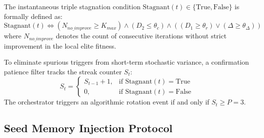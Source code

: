 The instantaneous triple stagnation condition $\text{Stagnant}(t) \in \{\text{True}, \text{False}\}$ is formally defined as:
\begin{equation}
\text{Stagnant}(t) \iff \left( N_{no\_improve} \ge K_{max} \right) \land \left( D_2 \le \theta_c \right) \land \left( (D_1 \ge \theta_r) \lor (\Delta \ge \theta_\Delta) \right)
\label{eq:stagnant_condition}
\end{equation}
where $N_{no\_improve}$ denotes the count of consecutive iterations without strict improvement in the local elite fitness.

To eliminate spurious triggers from short-term stochastic variance, a confirmation patience filter tracks the streak counter $S_t$:
\begin{equation}
S_t = \begin{cases}
S_{t-1} + 1, & \text{if } \text{Stagnant}(t) = \text{True} \\
0, & \text{if } \text{Stagnant}(t) = \text{False}
\end{cases}
\label{eq:streak_counter}
\end{equation}
The orchestrator triggers an algorithmic rotation event if and only if $S_t \ge P = 3$.




\subsection{Seed Memory Injection Protocol}

